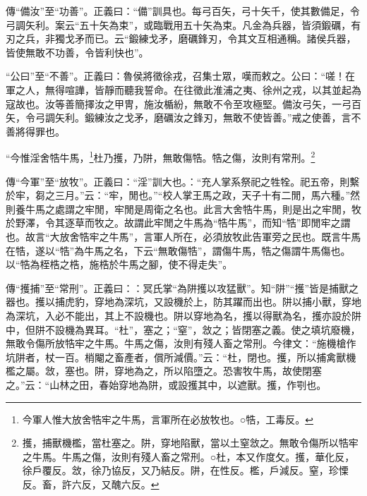 {\noindent\zhuan{}\fzbyks 傳“備汝”至“功善”。正義曰：“備”訓具也。每弓百矢，弓十矢千，使其數備足，令弓調矢利。案云“五十矢為束”，或臨戰用五十矢為束。凡金為兵器，皆須鍛礪，有刃之兵，非獨戈矛而已。云“鍛練戈矛，磨礪鋒刃，令其文互相通稱。諸侯兵器，皆使無敢不功善，令皆利快也”。 \par}

{\noindent\shu{}\fzkt “公曰”至“不善”。正義曰：魯侯將徵徐戎，召集士眾，嘆而敕之。公曰：“嗟！在軍之人，無得喧譁，皆靜而聽我誓命。在往徵此淮浦之夷、徐州之戎，以其並起為寇故也。汝等善簡擇汝之甲冑，施汝楯紛，無敢不令至攻極堅。備汝弓矢，一弓百矢，令弓調矢利。鍛練汝之戈矛，磨礪汝之鋒刃，無敢不使皆善。”戒之使善，言不善將得罪也。 \par}

“今惟淫舍牿牛馬，\footnote{今軍人惟大放舍牿牢之牛馬，言軍所在必放牧也。○牿，工毒反。}杜乃擭，乃阱，無敢傷牿。牿之傷，汝則有常刑。\footnote{擭，捕獸機檻，當杜塞之。阱，穿地陷獸，當以土窒敜之。無敢令傷所以牿牢之牛馬。牛馬之傷，汝則有殘人畜之常刑。○杜，本又作度攵。擭，華化反，徐戶覆反。敜，徐乃協反，又乃結反。阱，在性反。檻，戶減反。窒，珍慄反。畜，許六反，又醜六反。}


{\noindent\zhuan{}\fzbyks 傳“今軍”至“放牧”。正義曰：“淫”訓大也。：“充人掌系祭祀之牲牷。祀五帝，則繫於牢，芻之三月。”云：“牢，閒也。”“校人掌王馬之政，天子十有二閒，馬六種。”然則養牛馬之處謂之牢閒，牢閒是周衛之名也。此言大舍牿牛馬，則是出之牢閒，牧於野澤，令其逐草而牧之。故謂此牢閒之牛馬為“牿牛馬”，而知“牿”即閒牢之謂也。故言“大放舍牿牢之牛馬”，言軍人所在，必須放牧此告軍旁之民也。既言牛馬在牿，遂以“牿”為牛馬之名，下云“無敢傷牿”，謂傷牛馬，牿之傷謂牛馬傷也。以“牿為桎梏之梏，施梏於牛馬之腳，使不得走失”。 \par}

{\noindent\zhuan{}\fzbyks 傳“擭捕”至“常刑”。正義曰：：冥氏掌“為阱擭以攻猛獸”。知“阱”“擭”皆是捕獸之器也。擭以捕虎豹，穿地為深坑，又設機於上，防其躍而出也。阱以捕小獸，穿地為深坑，入必不能出，其上不設機也。阱以穿地為名，擭以得獸為名，擭亦設於阱中，但阱不設機為異耳。“杜”，塞之；“窒”，敜之；皆閉塞之義。使之填坑廢機，無敢令傷所放牿牢之牛馬。牛馬之傷，汝則有殘人畜之常刑。今律文：“施機槍作坑阱者，杖一百。梢閹之畜產者，償所減價。”云：“杜，閉也。擭，所以捕禽獸機檻之屬。敜，塞也。阱，穿地為之，所以陷墮之。恐害牧牛馬，故使閉塞之。”云：“山林之田，春始穿地為阱，或設擭其中，以遮獸。擭，作㓵也。 \par}

